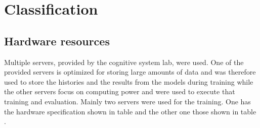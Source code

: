 \chapter{Classification}

\section{Hardware resources}
Multiple servers, provided by the cognitive system lab, were used. One of the provided servers is optimized for storing large amounts of data and was therefore used to store the histories and the results from the models during training while the other servers focus on computing power and were used to execute that training and evaluation. Mainly two servers were used for the training. One has the hardware specification shown in table  and the other one those shown in table . 


\begin{table}[H]
	\centering
	\caption{add caption}
\end{table}

\begin{table}[H]
	\centering
	\caption{add caption}
\end{table}

